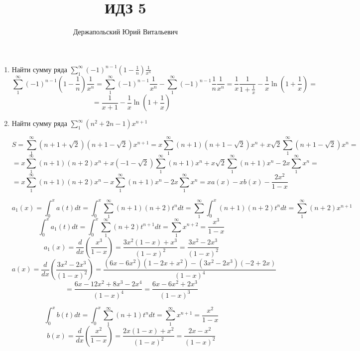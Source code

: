\documentclass{article}
\title{ИДЗ 5}
\author{Держапольский Юрий Витальевич}
\date{}
\begin{document}
\begin{large}
\maketitle

\begin{enumerate}

\item Найти сумму ряда $\sum\limits_{1}^{\infty} (-1)^{n-1} \left( 1 - \frac{1}{n} \right) \frac{1}{x^n}$
$$\sum_{1}^{\infty} (-1)^{n-1} \left( 1 - \frac{1}{n} \right) \frac{1}{x^n} = \sum_{1}^{\infty} (-1)^{n-1} \frac{1}{x^n} - \sum_{1}^{\infty} (-1)^{n-1} \frac{1}{n} \frac{1}{x^n} = \frac{1}{x} \frac{1}{1+\frac{1}{x}} - \frac{1}{x}\ln \left(1+\frac{1}{x}\right) = $$
$$ = \frac{1}{x+1} - \frac{1}{x}\ln \left(1+\frac{1}{x}\right) $$

\item Найти сумму ряда $\sum\limits_{1}^{\infty} (n^2 + 2n - 1) x^{n+1} $

$$ S = \sum\limits_{1}^{\infty} (n + 1 + \sqrt{2})(n+1-\sqrt{2}) x^{n+1} = x \sum\limits_{1}^{\infty} (n + 1)(n+1-\sqrt{2}) x^n + x\sqrt{2}\sum\limits_{1}^{\infty} (n+1-\sqrt{2}) x^n = $$
$$ = x \sum\limits_{1}^{\infty} (n + 1)(n+2) x^n + x (-1 -\sqrt{2})\sum\limits_{1}^{\infty} (n + 1) x^n + x\sqrt{2}\sum\limits_{1}^{\infty} (n+1) x^n - 2 x\sum\limits_{1}^{\infty} x^n = $$
$$ = x \sum\limits_{1}^{\infty} (n + 1)(n+2) x^n - x\sum\limits_{1}^{\infty} (n + 1) x^n - 2 x\sum\limits_{1}^{\infty} x^n = xa(x) - x b(x) - \frac{2x^2}{1-x}$$

$$ a_1(x) = \int_{0}^{x} a(t)dt = \int_{0}^{x} \sum\limits_{1}^{\infty} (n + 1)(n+2) t^n dt = \sum\limits_{1}^{\infty} \int_{0}^{x} (n + 1)(n+2) t^n dt = \sum\limits_{1}^{\infty} (n+2)x^{n+1} $$
$$ \int_{0}^{x} a_1(t)dt  = \int_{0}^{x} \sum\limits_{1}^{\infty} (n+2)t^{n+1} dt = \sum\limits_{1}^{\infty} x^{n+2} = \frac{x^3}{1-x}$$
$$ a_1(x) = \frac{d}{dx} \left( \frac{x^3}{1-x} \right) = \frac{3x^2(1-x) + x^3}{(1-x)^2} = \frac{3x^2-2x^3}{(1-x)^2} $$
$$ a(x) = \frac{d}{dx} \left( \frac{3x^2-2x^3}{(1-x)^2} \right) = \frac{(6x-6x^2)(1-2x+x^2) - (3x^2 - 2x^3)(-2+2x)}{(1-x)^4} $$
$$ = \frac{6x-12x^2+8x^3-2x^4}{(1-x)^4} = \frac{6x-6x^2+2x^3}{(1-x)^3} $$

$$ \int_{0}^{x} b(t) dt = \int_{0}^{x} \sum\limits_{1}^{\infty} (n + 1) t^n dt = \sum\limits_{1}^{\infty} x^{n+1} = \frac{x^2}{1-x} $$
$$ b(x) = \frac{d}{dx} \left( \frac{x^2}{1-x} \right) = \frac{2x(1-x) + x^2}{(1-x)^2} = \frac{2x-x^2}{(1-x)^2} $$


\end{enumerate}
\end{large}
\end{document}
